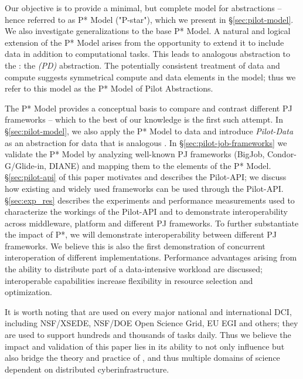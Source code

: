 \documentclass[conference]{IEEEtran}
\begin{document}


Our objective is to provide a minimal, but complete model for \pilot
abstractions -- hence referred to as P* Model ("P-star"), which we
present in \S\ref{sec:pilot-model}.  We also investigate
generalizations to the base P* Model.  A natural and logical extension
of the P* Model arises from the opportunity to extend it to include
data in addition to computational tasks. This leads to analogous
abstraction to the \pilotjob: the \emph{\pilotdata (PD)}
abstraction. The potentially consistent treatment of data and compute
suggests symmetrical compute and data elements in the model; thus we
refer to this model as the P* Model of Pilot Abstractions.

The P* Model provides a conceptual basis to compare and contrast
different PJ frameworks -- which to the best of our knowledge is the
first such attempt. In \S\ref{sec:pilot-model}, we also apply the P*
Model to data and introduce {\it Pilot-Data} as an abstraction for
data that is analogous \pilotjobs. In \S\ref{sec:pilot-job-frameworks}
we validate the P* Model by analyzing well-known PJ frameworks
(BigJob, Condor-G/Glide-in, DIANE) and mapping them to the elements of
the P* Model. \S\ref{sec:pilot-api} of this paper motivates and
describes the Pilot-API; we discuss how existing and widely used
\pilotjob frameworks can be used through the
Pilot-API. \S\ref{sec:exp_res} describes the experiments and
performance measurements used to characterize the workings of the
Pilot-API and to demonstrate interoperability across middleware,
platform and different PJ frameworks. To further substantiate the
impact of P*, we will demonstrate interoperability between different
PJ frameworks. %
We believe this is also the first demonstration of concurrent
interoperation of different \pilotjob implementations. Performance
advantages arising from the ability to distribute part of a
data-intensive workload are discussed; interoperable capabilities
increase flexibility in resource selection and optimization.

It is worth noting that \pilotjobs are used on every major national
and international DCI, including NSF/XSEDE, NSF/DOE Open Science Grid,
EU EGI and others; they are used to support hundreds and thousands of
tasks daily. Thus we believe the impact and validation of this paper
lies in its ability to not only influence but also bridge the theory
and practice of \pilotjobs, and thus multiple domains of science
dependent on distributed cyberinfrastructure.
\end{document}
